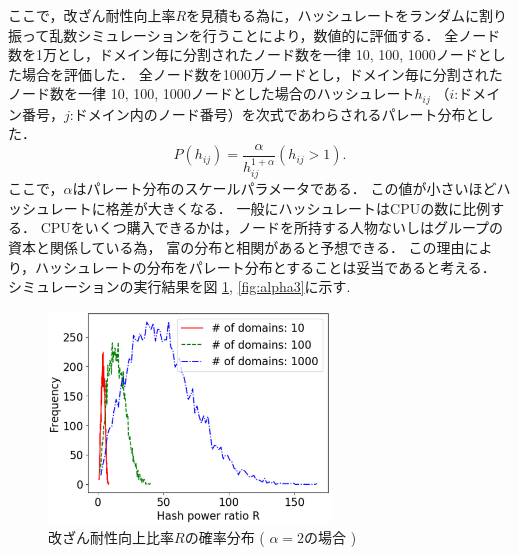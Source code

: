 \documentclass[a4paper,12pt]{jsarticle}
\begin{document}
ここで，改ざん耐性向上率$R$を見積もる為に，ハッシュレートをランダムに割り振って乱数シミュレーションを行うことにより，数値的に評価する．
全ノード数を1万とし，ドメイン毎に分割されたノード数を一律 10, 100, 1000ノードとした場合を評価した．
全ノード数を1000万ノードとし，ドメイン毎に分割されたノード数を一律 10, 100, 1000ノードとした場合のハッシュレート$ h_{ij} $ （$i$:ドメイン番号，$j$:ドメイン内のノード番号）を次式であわらされるパレート分布とした．
%
\begin{equation}
	P(h_{ij}) = \frac{\alpha}{h_{ij}^{1+\alpha}} (h_{ij} > 1).
\end{equation}
%
ここで，$\alpha$はパレート分布のスケールパラメータである．
この値が小さいほどハッシュレートに格差が大きくなる．
一般にハッシュレートはCPUの数に比例する．
CPUをいくつ購入できるかは，ノードを所持する人物ないしはグループの資本と関係している為，
富の分布と相関があると予想できる．
この理由により，ハッシュレートの分布をパレート分布とすることは妥当であると考える．
シミュレーションの実行結果を図 \ref{fig:alpha2}, \ref{fig:alpha3}に示す. 
%
\begin{figure}[tbh]
  \begin{center}
    \includegraphics[width=75mm]{pht/hist-comp-R-alpha2.0-m1.0.eps}
  \end{center}
  \caption{改ざん耐性向上比率$R$の確率分布 ( $\alpha=2$の場合 ) }
  \label{fig:alpha2}
\end{figure}
%
%
\end{document}
